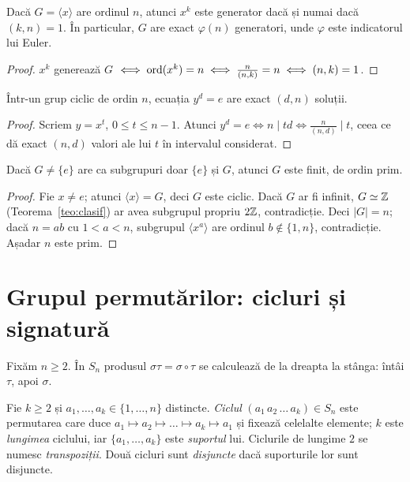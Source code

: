 \begin{propozitie}[generatorii]\label{prop:generatori}
Dacă $G=\langle x\rangle$ are ordinul $n$, atunci $x^k$ este generator dacă și numai dacă $(k,n)=1$. În particular, $G$ are exact $\varphi(n)$ generatori, unde $\varphi$ este indicatorul lui Euler.
\end{propozitie}

\begin{proof}
$x^k$ generează $G$ $\iff\operatorname{ord}(x^k)=n\iff\frac{n}{(n,k)}=n\iff(n,k)=1$.
\end{proof}

\begin{propozitie}[numărul soluțiilor lui $y^d=e$]\label{prop:solutii}
Într-un grup ciclic de ordin $n$, ecuația $y^d=e$ are exact $(d,n)$ soluții.
\end{propozitie}

\begin{proof}
Scriem $y=x^t$, $0\le t\le n-1$. Atunci $y^d=e\iff n\mid td\iff\frac{n}{(n,d)}\mid t$, ceea ce dă exact $(n,d)$ valori ale lui $t$ în intervalul considerat.
\end{proof}

\begin{propozitie}\label{prop:farasub}
Dacă $G\neq\{e\}$ are ca subgrupuri doar $\{e\}$ și $G$, atunci $G$ este finit, de ordin prim.
\end{propozitie}

\begin{proof}
Fie $x\neq e$; atunci $\langle x\rangle=G$, deci $G$ este ciclic. Dacă $G$ ar fi infinit, $G\simeq\mathbb{Z}$ (Teorema~\ref{teo:clasif}) ar avea subgrupul propriu $2\mathbb{Z}$, contradicție. Deci $|G|=n$; dacă $n=ab$ cu $1<a<n$, subgrupul $\langle x^a\rangle$ are ordinul $b\notin\{1,n\}$, contradicție. Așadar $n$ este prim.
\end{proof}

\section{Grupul permutărilor: cicluri și signatură}\label{sec:permutari}

Fixăm $n\ge2$. În $S_n$ produsul $\sigma\tau=\sigma\circ\tau$ se calculează de la dreapta la stânga: întâi $\tau$, apoi $\sigma$.

\begin{definitie}\label{def:ciclu}
Fie $k\ge2$ și $a_1,\dots,a_k\in\{1,\dots,n\}$ distincte. \emph{Ciclul} $(a_1\,a_2\,\dots\,a_k)\in S_n$ este permutarea care duce $a_1\mapsto a_2\mapsto\dots\mapsto a_k\mapsto a_1$ și fixează celelalte elemente; $k$ este \emph{lungimea} ciclului, iar $\{a_1,\dots,a_k\}$ este \emph{suportul} lui. Ciclurile de lungime $2$ se numesc \emph{transpoziții}. Două cicluri sunt \emph{disjuncte} dacă suporturile lor sunt disjuncte.
\end{definitie}

